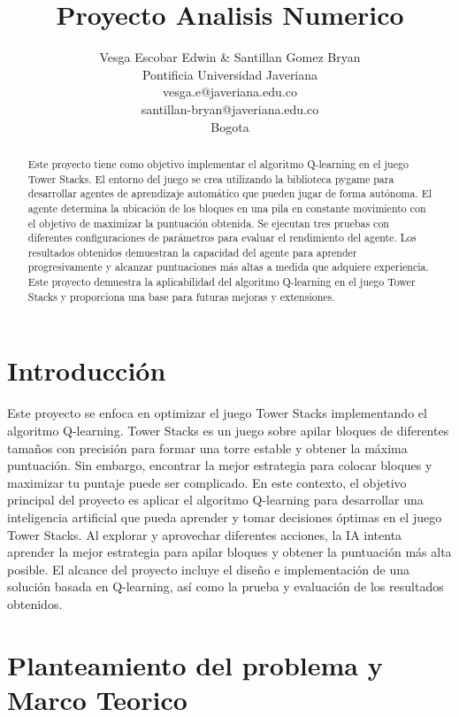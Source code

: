 \documentclass[a4paper]{article}
\title{Proyecto Analisis Numerico }
\author{Vesga Escobar Edwin & Santillan Gomez Bryan\\
  \small Pontificia Universidad Javeriana\\
  \small vesga.e@javeriana.edu.co\\
  \small santillan-bryan@javeriana.edu.co\\
  \small Bogota\\
  \small
}
\begin{document}
\maketitle

\begin{abstract}
Este proyecto tiene como objetivo implementar el algoritmo  Q-learning en el juego  Tower Stacks. El entorno del juego se crea utilizando la biblioteca pygame para desarrollar agentes de aprendizaje automático que pueden jugar de forma autónoma. El agente determina la ubicación de los bloques en una pila en constante movimiento con el objetivo de maximizar la puntuación obtenida. Se ejecutan tres pruebas con diferentes configuraciones de parámetros para evaluar el rendimiento del agente. Los resultados obtenidos demuestran la capacidad del agente para aprender progresivamente y alcanzar puntuaciones más altas a medida que adquiere experiencia. Este proyecto demuestra la aplicabilidad del algoritmo  Q-learning en el juego  Tower Stacks y proporciona una base para futuras mejoras y extensiones.
\end{abstract}

\section{Introducci\'on}

Este proyecto se enfoca en optimizar el juego  Tower Stacks implementando el algoritmo  Q-learning. Tower Stacks es un juego sobre apilar bloques de diferentes tamaños con precisión para formar una torre estable y obtener la máxima puntuación. Sin embargo, encontrar la mejor estrategia  para colocar  bloques y maximizar tu puntaje puede ser complicado. 
 En este contexto, el  objetivo principal del proyecto es aplicar el algoritmo  Q-learning para desarrollar una inteligencia artificial que pueda aprender y tomar decisiones óptimas en el juego  Tower Stacks. Al explorar y aprovechar diferentes acciones, la IA intenta aprender la mejor estrategia para apilar  bloques y obtener la  puntuación más alta posible.  El alcance del proyecto incluye el diseño e implementación de una solución basada en Q-learning, así como la prueba y evaluación de los resultados obtenidos. 

\section{Planteamiento del problema y Marco Teorico}
 
\end{document}
